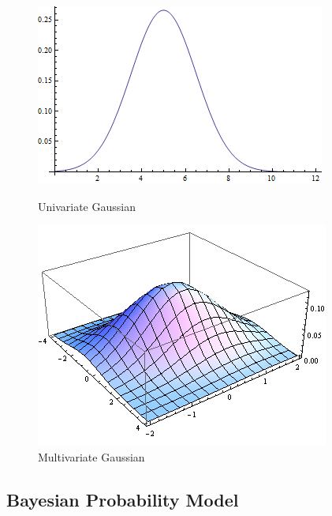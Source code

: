 \documentclass[english]{tktltiki}
\begin{document}
\begin{figure}
\centering
\begin{minipage}{.5\linewidth}
  \centering
  \includegraphics[width=\linewidth]{gp_1d.png}
  \caption{Univariate Gaussian}
  \label{fig:gaussian_1d}
\end{minipage}%
\begin{minipage}{.41\linewidth}
  \centering
  \includegraphics[width=\linewidth]{gp_2d.png}
  \caption{Multivariate Gaussian}
  \label{fig:gaussian_2d}
\end{minipage}

\label{fig:test}
\end{figure}


\subsection{Bayesian Probability Model}
\end{document}
